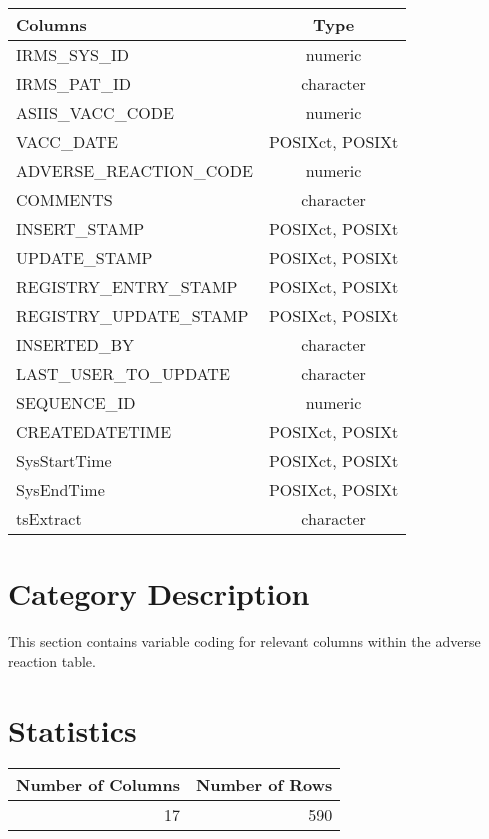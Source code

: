 \documentclass[
  letterpaper,
  DIV=11,
  numbers=noendperiod]{scrreprt}
\begin{document}
\begin{longtable}{lc}
\toprule
Columns & Type \\ 
\midrule
IRMS\_SYS\_ID & numeric \\ 
IRMS\_PAT\_ID & character \\ 
ASIIS\_VACC\_CODE & numeric \\ 
VACC\_DATE & POSIXct, POSIXt \\ 
ADVERSE\_REACTION\_CODE & numeric \\ 
COMMENTS & character \\ 
INSERT\_STAMP & POSIXct, POSIXt \\ 
UPDATE\_STAMP & POSIXct, POSIXt \\ 
REGISTRY\_ENTRY\_STAMP & POSIXct, POSIXt \\ 
REGISTRY\_UPDATE\_STAMP & POSIXct, POSIXt \\ 
INSERTED\_BY & character \\ 
LAST\_USER\_TO\_UPDATE & character \\ 
SEQUENCE\_ID & numeric \\ 
CREATEDATETIME & POSIXct, POSIXt \\ 
SysStartTime & POSIXct, POSIXt \\ 
SysEndTime & POSIXct, POSIXt \\ 
tsExtract & character \\ 
\bottomrule
\end{longtable}

\hypertarget{category-description-1}{%
\section*{Category Description}\label{category-description-1}}

This section contains variable coding for relevant columns within the
adverse reaction table.

\hypertarget{statistics-1}{%
\section*{Statistics}\label{statistics-1}}

\begin{longtable}{rr}
\toprule
Number of Columns & Number of Rows \\ 
\midrule
17 & 590 \\ 
\bottomrule
\end{longtable}
\end{document}
